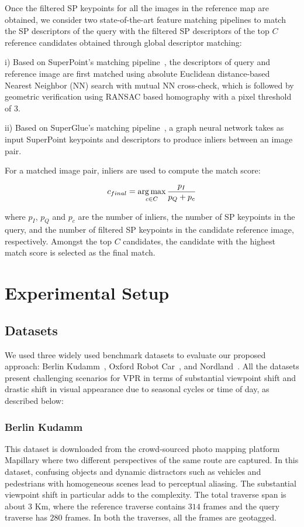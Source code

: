 \documentclass[letterpaper, 10 pt, conference]{ieeeconf}  \fi
\DeclareMathOperator*{\argmax}{arg\,max}
\begin{document}
Once the filtered SP keypoints for all the images in the reference map are obtained, we consider two state-of-the-art feature matching pipelines to match the SP descriptors of the query with the filtered SP descriptors of the top $C$ reference candidates obtained through global descriptor matching:

i) Based on SuperPoint's matching pipeline~\cite{detone2018superpoint}, the descriptors of query and reference image are first matched using absolute Euclidean distance-based Nearest Neighbor (NN) search with mutual NN cross-check, which is followed by geometric verification using RANSAC based homography with a pixel threshold of $3$.

ii) Based on SuperGlue's matching pipeline~\cite{sarlin2020superglue}, a graph neural network takes as input SuperPoint keypoints and descriptors to produce inliers between an image pair.

For a matched image pair, inliers are used to compute the match score:

\begin{equation}
\centering
    c_{final} = \argmax_{c\in C}\frac{p_I}{p_Q+p_c}
\end{equation}

where $p_I$, $p_Q$ and $p_c$ are the number of inliers, the number of SP keypoints in the query, and the number of filtered SP keypoints in the candidate reference image, respectively. Amongst the top $C$ candidates, the candidate with the highest match score is selected as the final match.

\section{Experimental Setup}

\subsection{Datasets}
\label{sec:datasets}

We used three widely used benchmark datasets to evaluate our proposed approach: Berlin Kudamm~\cite{8202131,sunderhauf2015place}, Oxford Robot Car~\cite{maddern20171}, and Nordland~\cite{olid2018single}. All the datasets present challenging scenarios for VPR in terms of substantial viewpoint shift and drastic shift in visual appearance due to seasonal cycles or time of day, as described below:

\subsubsection{Berlin Kudamm} This dataset is downloaded from the crowd-sourced photo mapping platform Mapillary where two different perspectives of the same route are captured. In this dataset, confusing objects and dynamic distractors such as vehicles and pedestrians with homogeneous scenes lead to perceptual aliasing. The substantial viewpoint shift in particular adds to the complexity. The total traverse span is about $3$ Km, where the reference traverse contains $314$ frames and the query traverse has $280$ frames. In both the traverses, all the frames are geotagged.
\end{document}
